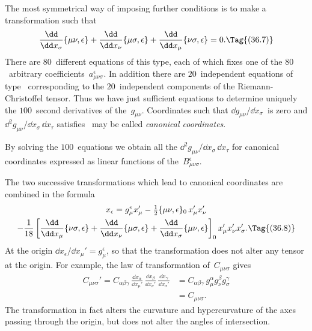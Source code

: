 \documentclass[12pt]{book}
\begin{document}
The most symmetrical way of imposing further conditions is to make a
transformation such that
\[
\frac{\dd}{\dd x_{\sigma}} \{\mu\nu, \epsilon\}
+ \frac{\dd}{\dd x_{\nu}} \{\mu\sigma, \epsilon\}
+ \frac{\dd}{\dd x_{\mu}} \{\nu\sigma, \epsilon\} = 0.
\Tag{(36.7)}
\]
There are $80$~different equations of this type, each of which fixes one of the
$80$~arbitrary coefficients~$a_{\mu\nu\sigma}^{\epsilon}$. In addition there are $20$~independent equations
of type~ corresponding to the $20$~independent components of the
Riemann\hyp{}Christoffel tensor. Thus we have just sufficient equations to determine
uniquely the $100$~second derivatives of the~$g_{\mu\nu}$. Coordinates such that
$\dd g_{\mu\nu}/\dd x_{\sigma}$~is zero and $\dd^{2} g_{\mu\nu}/\dd x_{\sigma}\, \dd x_{\tau}$ satisfies~ may be called \emph{canonical
coordinates}.

By solving the $100$~equations we obtain all the $\dd^{2} g_{\mu\nu}/\dd x_{\sigma}\, \dd x_{\tau}$ for canonical
coordinates expressed as linear functions of the~$B_{\mu\nu\sigma}^{\epsilon}$.

The two successive transformations which lead to canonical coordinates
%
%
%
are combined in the formula
\begin{multline*}
  x_{\epsilon} = g_{\mu}^{\epsilon} x_{\mu}'
  - \tfrac{1}{2}\{\mu\nu, \epsilon\}_{0}\, x_{\mu}' x_{\nu}' \\
  - \frac{1}{18}\left[\frac{\dd}{\dd x_{\mu}}\{\nu\sigma, \epsilon\}
                    + \frac{\dd}{\dd x_{\nu}} \{\mu\sigma, \epsilon\}
                    + \frac{\dd}{\dd x_{\sigma}} \{\mu\nu, \epsilon\}\right]_{0}
  x_{\mu}' x_{\nu}' x_{\sigma}'.
  \Tag{(36.8)}
\end{multline*}
At the origin $\dd x_{\epsilon}/\dd x_{\mu}' = g_{\mu}^{\epsilon}$, so that the transformation does not alter any
tensor at the origin. For example, the law of transformation of~$C_{\mu\nu\sigma}$ gives
\begin{align*}
  C_{\mu\nu\sigma}'
  = C_{\alpha\beta\gamma}\, \frac{\dd x_{\alpha}}{\dd x_{\mu}'}\,
  \frac{\dd x_{\beta}}{\dd x_{\nu}'}\,
  \frac{\dd x_{\gamma}}{\dd x_{\sigma}'}
  &= C_{\alpha\beta\gamma}\, g_{\mu}^{\alpha} g_{\nu}^{\beta} g_{\sigma}^{\gamma} \\
  &= C_{\mu\nu\sigma}.
\end{align*}
The transformation in fact alters the curvature and hypercurvature of the
axes passing through the origin, but does not alter the angles of intersection.
\end{document}
